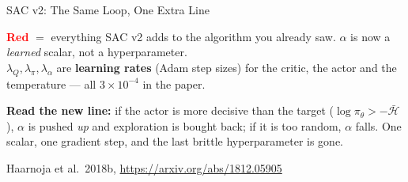 \begin{frame}{SAC v2: The Same Loop, One Extra Line}
\begin{center}
{\scriptsize\textbf{\textcolor{red}{Red}} $=$ everything SAC v2 adds to the algorithm you already saw. $\alpha$ is now a \emph{learned} scalar, not a hyperparameter.\\
$\lambda_Q,\lambda_\pi,\lambda_\alpha$ are \textbf{learning rates} (Adam step sizes) for the critic, the actor and the temperature --- all $3\times10^{-4}$ in the paper.}
\end{center}
\begin{center}
\end{center}
\vspace{-0.5em}
{\footnotesize \textbf{Read the new line:} if the actor is more decisive than the target ($\log\pi_\theta > -\bar{\mathcal{H}}$), $\alpha$ is pushed \emph{up} and exploration is bought back; if it is too random, $\alpha$ falls. One scalar, one gradient step, and the last brittle hyperparameter is gone.}
\begin{flushleft}
    \tiny Haarnoja et al.\ 2018b, \url{https://arxiv.org/abs/1812.05905}
\end{flushleft}
\end{frame}

